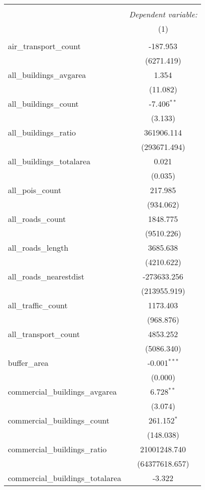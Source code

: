 \begin{table}[!htbp] \centering
\begin{tabular}{@{\extracolsep{5pt}}lc}
\\[-1.8ex]\hline
\hline \\[-1.8ex]
& \multicolumn{1}{c}{\textit{Dependent variable:}} \
\cr \cline{1-2}
\\[-1.8ex] & (1) \\
\hline \\[-1.8ex]
 air_transport_count & -187.953$^{}$ \\
  & (6271.419) \\
 all_buildings_avgarea & 1.354$^{}$ \\
  & (11.082) \\
 all_buildings_count & -7.406$^{**}$ \\
  & (3.133) \\
 all_buildings_ratio & 361906.114$^{}$ \\
  & (293671.494) \\
 all_buildings_totalarea & 0.021$^{}$ \\
  & (0.035) \\
 all_pois_count & 217.985$^{}$ \\
  & (934.062) \\
 all_roads_count & 1848.775$^{}$ \\
  & (9510.226) \\
 all_roads_length & 3685.638$^{}$ \\
  & (4210.622) \\
 all_roads_nearestdist & -273633.256$^{}$ \\
  & (213955.919) \\
 all_traffic_count & 1173.403$^{}$ \\
  & (968.876) \\
 all_transport_count & 4853.252$^{}$ \\
  & (5086.340) \\
 buffer_area & -0.001$^{***}$ \\
  & (0.000) \\
 commercial_buildings_avgarea & 6.728$^{**}$ \\
  & (3.074) \\
 commercial_buildings_count & 261.152$^{*}$ \\
  & (148.038) \\
 commercial_buildings_ratio & 21001248.740$^{}$ \\
  & (64377618.657) \\
 commercial_buildings_totalarea & -3.322$^{}$ \\

\end{tabular}
\end{table}
